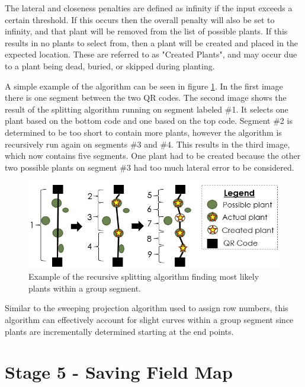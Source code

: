 The lateral and closeness penalties are defined as infinity if the input exceeds a certain threshold.  If this occurs then the overall penalty will also be set to infinity, and that plant will be removed from the list of possible plants.  If this results in no plants to select from, then a plant will be created and placed in the expected location.  These are referred to as "Created Plants", and may occur due to a plant being dead, buried, or skipped during planting.  

A simple example of the algorithm can be seen in figure \ref{figure:recursive_algorithm}.  In the first image there is one segment between the two QR codes.  The second image shows the result of the splitting algorithm running on segment labeled \#1. It selects one plant based on the bottom code and one based on the top code.  Segment \#2 is determined to be too short to contain more plants, however the algorithm is recursively run again on segments \#3 and \#4.  This results in the third image, which now contains five segments.  One plant had to be created because the other two possible plants on segment \#3 had too much lateral error to be considered.   

\begin{figure}
	\centering
    \includegraphics[width=5in]{figures/recursive_algorithm2.jpg}
    \caption[Recursive splitting algorithm]{Example of the recursive splitting algorithm finding most likely plants within a group segment.}
    \label{figure:recursive_algorithm}
\end{figure}

Similar to the sweeping projection algorithm used to assign row numbers, this algorithm can effectively account for slight curves within a group segment since plants are incrementally determined starting at the end points. 

\section{Stage 5 - Saving Field Map}
\label{processing-stage5}


